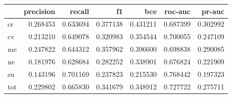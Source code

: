 \begin{tabular}{lrrrrrr}
\toprule
{} &  precision &    recall &        f1 &       bce &   roc-auc &    pr-auc \\
\midrule
cr  &   0.268453 &  0.633694 &  0.377138 &  0.431211 &  0.687399 &  0.302992 \\
cv  &   0.213210 &  0.649078 &  0.320983 &  0.354544 &  0.700055 &  0.247109 \\
me  &   0.247822 &  0.644312 &  0.357962 &  0.396600 &  0.698838 &  0.290085 \\
ne  &   0.181976 &  0.628684 &  0.282252 &  0.338901 &  0.676824 &  0.221909 \\
su  &   0.143196 &  0.701169 &  0.237823 &  0.215530 &  0.768442 &  0.197323 \\
tot &   0.229802 &  0.665830 &  0.341679 &  0.348912 &  0.727722 &  0.275711 \\
\bottomrule
\end{tabular}
